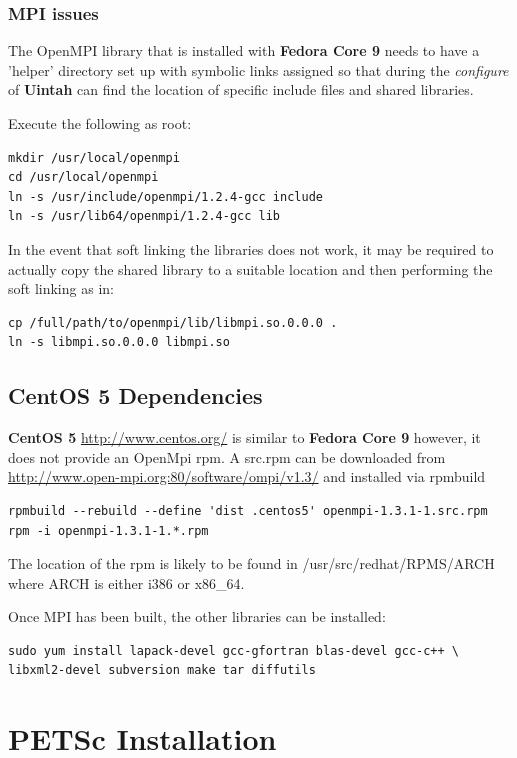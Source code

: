 \documentclass[12pt]{article}
\begin{document}
\subsubsection{MPI issues} 
\label{sec:mpi}

The OpenMPI library that is installed with \textbf{Fedora Core 9}
needs to have a 'helper' directory set up with symbolic links assigned
so that during the \emph{configure} of \textbf{Uintah} can find the
location of specific include files and shared libraries.

Execute the following as root:

\begin{Verbatim}
mkdir /usr/local/openmpi
cd /usr/local/openmpi
ln -s /usr/include/openmpi/1.2.4-gcc include
ln -s /usr/lib64/openmpi/1.2.4-gcc lib
\end{Verbatim}

In the event that soft linking the libraries does not work, it may be
required to actually copy the shared library to a suitable location
and then performing the soft linking as in:

\begin{Verbatim}
cp /full/path/to/openmpi/lib/libmpi.so.0.0.0 .
ln -s libmpi.so.0.0.0 libmpi.so
\end{Verbatim}


\subsection{CentOS 5 Dependencies}

\textbf{CentOS 5} \url{http://www.centos.org/} is similar to \textbf{Fedora
Core 9} however, it does not provide an OpenMpi rpm.  A src.rpm can be
downloaded from \url{http://www.open-mpi.org:80/software/ompi/v1.3/}
and installed via rpmbuild

\begin{Verbatim}
rpmbuild --rebuild --define 'dist .centos5' openmpi-1.3.1-1.src.rpm
rpm -i openmpi-1.3.1-1.*.rpm
\end{Verbatim}
The location of the rpm is likely to be found in
/usr/src/redhat/RPMS/ARCH where ARCH is either i386 or x86\_64.

Once MPI has been built, the other libraries can be installed:
\begin{verbatim}
sudo yum install lapack-devel gcc-gfortran blas-devel gcc-c++ \
libxml2-devel subversion make tar diffutils
\end{verbatim}


\section{PETSc Installation}
\end{document}
